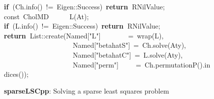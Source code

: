 \documentclass[shortnames,article]{jss}
\newcommand{\hlstd}[1]{\textcolor[rgb]{0,0,0}{#1}}
\newcommand{\hlopt}[1]{\textcolor[rgb]{0,0,0}{#1}}
\newcommand{\hlstr}[1]{\textcolor[rgb]{0.90,0.15,0.15}{#1}}
\newcommand{\hlkwa}[1]{\textcolor[rgb]{0.61,0.13,0.93}{\bf{#1}}}
\newcommand{\hlkwb}[1]{\textcolor[rgb]{0.13,0.54,0.13}{#1}}
\newcommand{\hlkwd}[1]{\textcolor[rgb]{0,0,0}{#1}}
\begin{document}
\begin{figure}[htb]
    \hlstd{}\hlkwa{if\ }\hlstd{}\hlopt{(}\hlstd{Ch}\hlopt{.}\hlstd{}\hlkwd{info}\hlstd{}\hlopt{()\ !=\ }\hlstd{Eigen}\hlopt{::}\hlstd{Success}\hlopt{)\ }\hlstd{}\hlkwa{return\ }\hlstd{R\textunderscore NilValue}\hlopt{;}\hspace*{\fill}\\
    \hlstd{}\hlkwb{const\ }\hlstd{CholMD}\hlstd{\ \ \ \ \ \ }\hlstd{}\hlkwd{L}\hlstd{}\hlopt{(}\hlstd{At}\hlopt{);}\hspace*{\fill}\\
    \hlstd{}\hlkwa{if\ }\hlstd{}\hlopt{(}\hlstd{L}\hlopt{.}\hlstd{}\hlkwd{info}\hlstd{}\hlopt{()\ !=\ }\hlstd{Eigen}\hlopt{::}\hlstd{Success}\hlopt{)\ }\hlstd{}\hlkwa{return\ }\hlstd{R\textunderscore NilValue}\hlopt{;}\hspace*{\fill}\\
    \hlstd{}\hlkwa{return\ }\hlstd{List}\hlopt{::}\hlstd{}\hlkwd{create}\hlstd{}\hlopt{(}\hlstd{Named}\hlopt{{[}}\hlstd{}\hlstr{"L"}\hlstd{}\hlopt{{]}}\hlstd{\ \ \ \ \ \ \ \ }\hlopt{=\ }\hlstd{}\hlkwd{wrap}\hlstd{}\hlopt{(}\hlstd{L}\hlopt{),}\hspace*{\fill}\\
    \hlstd{}\hlstd{\ \ \ \ \ \ \ \ \ \ \ \ \ \ \ \ \ \ \ \ }\hlstd{Named}\hlopt{{[}}\hlstd{}\hlstr{"betahatS"}\hlstd{}\hlopt{{]}\ =\ }\hlstd{Ch}\hlopt{.}\hlstd{}\hlkwd{solve}\hlstd{}\hlopt{(}\hlstd{Aty}\hlopt{),}\hspace*{\fill}\\
    \hlstd{}\hlstd{\ \ \ \ \ \ \ \ \ \ \ \ \ \ \ \ \ \ \ \ }\hlstd{Named}{{[}}\hlstd{}\hlstr{"betahatC"}\hlstd{}\hlopt{{]}\ =\ }\hlstd{L}\hlopt{.}\hlstd{}\hlkwd{solve}\hlstd{}\hlopt{(}\hlstd{Aty}\hlopt{),}\hspace*{\fill}\\
    \hlstd{}\hlstd{\ \ \ \ \ \ \ \ \ \ \ \ \ \ \ \ \ \ \ \ }\hlstd{Named}\hlopt{{[}}\hlstd{}\hlstr{"perm"}\hlstd{}\hlopt{{]}}\hlstd{\ \ \ \ \ }\hlopt{=\ }\hlstd{Ch}\hlopt{.}\hlstd{}\hlkwd{permutationP}\hlstd{}\hlopt{().}\hlstd{}\hlkwd{indices}\hlstd{}\hlopt{());}\hlstd{}\hspace*{\fill}\\
    \mbox{}
    \normalfont
    \normalsize
  \caption{\textbf{sparseLSCpp}: Solving a sparse least squares problem}
  \label{fig:spLS}
\end{figure}
\end{document}
